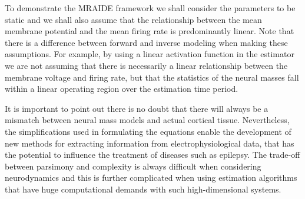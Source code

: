\documentclass[review,authoryear,3p]{elsarticle}
\begin{document}
To demonstrate the MRAIDE framework we shall consider the parameters to be static and we shall also assume that the relationship between the mean membrane potential and the mean firing rate is predominantly linear. Note that there is a difference between forward and inverse modeling when making these assumptions. For example, by using a linear activation function in the estimator we are not assuming that there is necessarily a linear relationship between the membrane voltage and firing rate, but that the statistics of the neural masses fall within a linear operating region over the estimation time period. 

It is important to point out there is no doubt that there will always be a mismatch between neural mass models and actual cortical tissue. Nevertheless, the simplifications used in formulating the equations enable the development of new methods for extracting information from electrophysiological data, that has the potential to influence the treatment of diseases such as epilepsy. The trade-off between parsimony and complexity is always difficult when considering neurodynamics and this is further complicated when using estimation algorithms that have huge computational demands with such high-dimensional systems.
\end{document}
